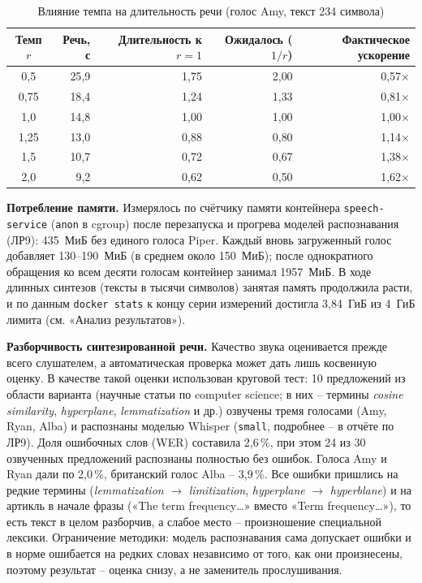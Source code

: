 \begin{table}[H]
  \centering
  \caption{Влияние темпа на длительность речи (голос Amy, текст 234 символа)}
  \label{tab:tempo}
  \small
  \begin{tabular}{|c|r|r|r|r|}
    \hline
    Темп $r$ & Речь, с & Длительность к $r=1$ & Ожидалось ($1/r$) & Фактическое ускорение \\
    \hline
    0{,}5 & 25{,}9 & 1{,}75 & 2{,}00 & 0{,}57$\times$ \\
    \hline
    0{,}75 & 18{,}4 & 1{,}24 & 1{,}33 & 0{,}81$\times$ \\
    \hline
    1{,}0 & 14{,}8 & 1{,}00 & 1{,}00 & 1{,}00$\times$ \\
    \hline
    1{,}25 & 13{,}0 & 0{,}88 & 0{,}80 & 1{,}14$\times$ \\
    \hline
    1{,}5 & 10{,}7 & 0{,}72 & 0{,}67 & 1{,}38$\times$ \\
    \hline
    2{,}0 & 9{,}2 & 0{,}62 & 0{,}50 & 1{,}62$\times$ \\
    \hline
  \end{tabular}
\end{table}

\textbf{Потребление памяти.} Измерялось по счётчику памяти
контейнера \texttt{speech-service} (\texttt{anon} в cgroup) после
перезапуска и прогрева моделей распознавания (ЛР9): 435~МиБ без
единого голоса Piper. Каждый вновь загруженный голос добавляет
130--190~МиБ (в среднем около 150~МиБ); после однократного обращения ко
всем десяти голосам контейнер занимал 1957~МиБ. В ходе длинных
синтезов (тексты в тысячи символов) занятая память продолжила расти, и по
данным \texttt{docker stats} к концу серии измерений достигла 3{,}84~ГиБ
из 4~ГиБ лимита (см. «Анализ результатов»).

\textbf{Разборчивость синтезированной речи.} Качество звука
оценивается прежде всего слушателем, а автоматическая проверка
может дать лишь косвенную оценку. В качестве такой оценки использован
круговой тест: 10 предложений из области варианта (научные статьи по
computer science; в них -- термины \emph{cosine similarity},
\emph{hyperplane}, \emph{lemmatization} и др.) озвучены тремя голосами
(Amy, Ryan, Alba) и распознаны моделью Whisper (\texttt{small},
подробнее -- в отчёте по ЛР9). Доля ошибочных слов (WER) составила
2{,}6\,\%, при этом 24 из 30 озвученных предложений распознаны
полностью без ошибок. Голоса Amy и Ryan дали по 2{,}0\,\%, британский
голос Alba -- 3{,}9\,\%. Все ошибки пришлись на редкие термины
(\emph{lemmatization} $\to$ \emph{limitization}, \emph{hyperplane} $\to$
\emph{hyperblane}) и на артикль в начале фразы («The term
frequency\ldots» вместо «Term frequency\ldots»), то есть текст в целом
разборчив, а слабое место -- произношение специальной лексики.
Ограничение методики: модель распознавания сама допускает ошибки и
в норме ошибается на редких словах независимо от того, как они
произнесены, поэтому результат -- оценка снизу, а не заменитель
прослушивания.


